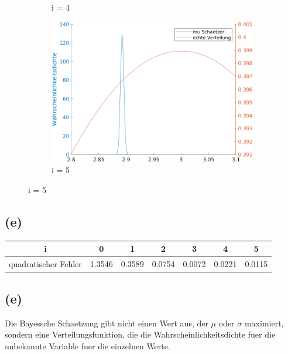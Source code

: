 \documentclass[a4paper]{scrartcl}
\begin{document}
\begin{figure}[H]
\begin{subfigure}{.5\textwidth}
			\caption*{i = 4}
		\end{subfigure}%
		\begin{subfigure}{.5\textwidth}
			\centering
			\includegraphics*[scale = 0.4]{assignment3_data/plots/q3_i5}
			\caption*{i = 5}
		\end{subfigure}
	\end{figure}

\subsection*{(e)}
\begin{tabular}{|c|c|c|c|c|c|c|}
	\hline 
	i & 0 & 1 & 2 & 3 & 4 & 5 \\ 
	\hline 
	quadratischer Fehler & 1.3546 & 0.3589 & 0.0754 & 0.0072 & 0.0221 & 0.0115 \\ 
	\hline 
\end{tabular}

\subsection*{(e)}
Die Bayessche Schaetzung gibt nicht einen Wert aus, der $\mu$ oder $\sigma$ maximiert, sondern eine Verteilungsfunktion, die die Wahrscheinlichkeitsdichte fuer die unbekannte Variable fuer die einzelnen Werte. 
\end{document}
